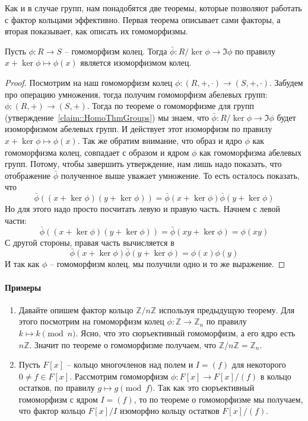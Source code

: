 Как и в случае групп, нам понадобятся две теоремы, которые позволяют работать с фактор кольцами эффективно.
Первая теорема описывает сами факторы, а вторая показывает, как описать их гомоморфизмы.

\begin{claim}
\label{claim::RingFirstHom}
Пусть $\phi\colon R\to S$ -- гомоморфизм колец.
Тогда $\bar \phi \colon R/\ker \phi \to \Im \phi$ по правилу $x + \ker \phi \mapsto \phi(x)$ является изоморфизмом колец.
\end{claim}
\begin{proof}
Посмотрим на наш гомоморфизм колец $\phi\colon (R, +, \cdot) \to (S, +, \cdot)$.
Забудем про операцию умножения, тогда получим гомоморфизм абелевых групп: $\phi \colon (R, +) \to (S, +)$.
Тогда по теореме о гомоморфизме для групп (утверждение~\ref{claim::HomoThmGroups}) мы знаем, что $\bar \phi \colon R/\ker \phi \to \Im\phi$ будет изоморфизмом абелевых групп.
И действует этот изоморфизм по правилу $x + \ker \phi \mapsto \phi(x)$.
Так же обратим внимание, что образ и ядро $\phi$ как гомоморфизма колец, совпадает с образом и ядром $\phi$ как гомоморфизма абелевых групп.
Потому, чтобы завершить утверждение, нам лишь надо показать, что отображение $\bar\phi$ полученное выше уважает умножение.
То есть осталось показать, что
\[
\bar\phi((x + \ker \phi) (y + \ker \phi)) = \bar \phi(x + \ker \phi) \bar \phi (y + \ker \phi)
\]
Но для этого надо просто посчитать левую и правую часть.
Начнем с левой части:
\[
\bar\phi((x + \ker \phi) (y + \ker \phi)) = \bar\phi(xy + \ker \phi) = \phi(xy)
\]
С другой стороны, правая часть вычисляется в
\[
 \bar \phi(x + \ker \phi) \bar \phi (y + \ker \phi) = \phi(x) \phi(y)
\]
И так как $\phi$ -- гомоморфизм колец, мы получили одно и то же выражение.
\end{proof}

\paragraph{Примеры}

\begin{enumerate}
\item Давайте опишем фактор кольцо $\mathbb Z / n \mathbb Z$ используя предыдущую теорему.
Для этого посмотрим на гомоморфизм колец $\phi \colon \mathbb Z\to \mathbb Z_n$ по правилу $k \mapsto k \pmod n$.
Ясно, что это сюръективный гомоморфизм, а его ядро есть $n \mathbb Z$.
Значит по теореме о гомоморфизме получаем, что $\mathbb Z/ n \mathbb Z = \mathbb Z_n$.

\item Пусть $F[x]$ -- кольцо многочленов над полем и $I = (f)$ для некоторого $0\neq f \in F[x]$.
Рассмотрим гомоморфизм $\phi\colon F[x]\to F[x]/(f)$ в кольцо остатков, по правилу $g \mapsto g \pmod f$.
Так как это сюръективный гомоморфизм с ядром $I = (f)$, то по теореме о гомоморфизме мы получаем, что фактор кольцо $F[x] / I$ изоморфно кольцу остатков $F[x]/(f)$.
\end{enumerate}

